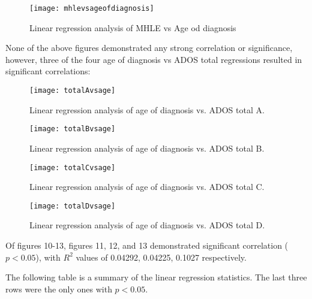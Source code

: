 \documentclass{article}
\begin{document}
\begin{figure}[!htb]
  \begin{minipage}[b]{0.49\linewidth}
    \texttt{[image: mhlevsageofdiagnosis]}
    \caption{Linear regression analysis of MHLE vs Age od diagnosis}
  \end{minipage}
\end{figure}
\newpage
None of the above figures demonstrated any strong correlation or significance, however, three of the four age of diagnosis vs ADOS total regressions resulted in significant correlations: 
\newpage
\begin{figure}[!htb]
  \centering
  \begin{minipage}[h!]{0.49\linewidth} 
    \texttt{[image: totalAvsage]}
    \caption{Linear regression analysis of age of diagnosis vs. ADOS total A.}
  \end{minipage}
  \hfill
  \begin{minipage}[h!]{0.49\linewidth}
    \texttt{[image: totalBvsage]}
    \caption{Linear regression analysis of age of diagnosis vs. ADOS total B.}
  \end{minipage}
\end{figure}

\begin{figure}[!htb]
  \centering
  \begin{minipage}[h!]{0.49\linewidth}
    \texttt{[image: totalCvsage]}
    \caption{Linear regression analysis of age of diagnosis vs. ADOS total C.}
  \end{minipage}
  \hfill
  \begin{minipage}[h!]{0.49\linewidth}
    \texttt{[image: totalDvsage]}
    \caption{Linear regression analysis of age of diagnosis vs. ADOS total D.}
  \end{minipage}
\end{figure}
Of figures 10-13, figures 11, 12, and 13 demonstrated significant correlation ($p<0.05$), with $R^2$ values of 0.04292, 0.04225, 0.1027 respectively.

\newpage
The following table is a summary of the linear regression statistics. The last three rows were the only ones with $p<0.05$.\\
\end{document}
